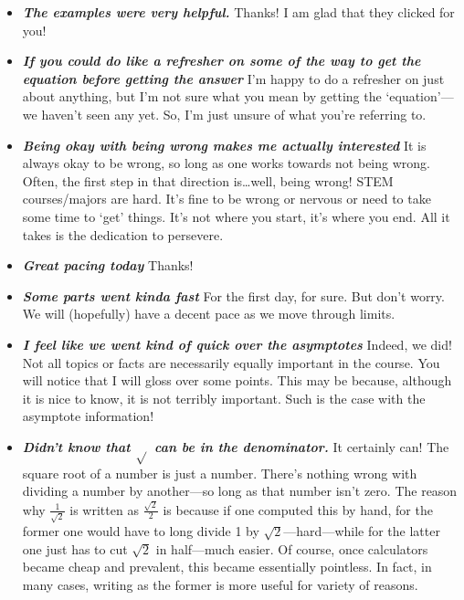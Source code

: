 \documentclass[11pt,letterpaper]{article}
\begin{document}
\begin{itemize}
\item {\bfseries\itshape The examples were very helpful.} Thanks! I am glad that they clicked for you!

\item {\bfseries\itshape If you could do like a refresher on some of the way to get the equation before getting the answer} I'm happy to do a refresher on just about anything, but I'm not sure what you mean by getting the `equation'---we haven't seen any yet. So, I'm just unsure of what you're referring to. 

\item {\bfseries\itshape Being okay with being wrong makes me actually interested} It is always okay to be wrong, so long as one works towards not being wrong. Often, the first step in that direction is\dots well, being wrong! STEM courses/majors are hard. It's fine to be wrong or nervous or need to take some time to `get' things. It's not where you start, it's where you end. All it takes is the dedication to persevere. 

\item {\bfseries\itshape Great pacing today} Thanks!

\item {\bfseries\itshape Some parts went kinda fast} For the first day, for sure. But don't worry. We will (hopefully) have a decent pace as we move through limits. 

\item {\bfseries\itshape I feel like we went kind of quick over the asymptotes} Indeed, we did! Not all topics or facts are necessarily equally important in the course. You will notice that I will gloss over some points. This may be because, although it is nice to know, it is not terribly important. Such is the case with the asymptote information! 

\item {\bfseries\itshape Didn't know that $\sqrt{}$ can be in the denominator.} It certainly can! The square root of a number is just a number. There's nothing wrong with dividing a number by another---so long as that number isn't zero. The reason why $\tfrac{1}{\sqrt{2}}$ is written as $\tfrac{\sqrt{2}}{2}$ is because if one computed this by hand, for the former one would have to long divide 1 by $\sqrt{2}$---hard---while for the latter one just has to cut $\sqrt{2}$ in half---much easier. Of course, once calculators became cheap and prevalent, this became essentially pointless. In fact, in many cases, writing as the former is more useful for variety of reasons.  


\end{itemize}
\end{document}
